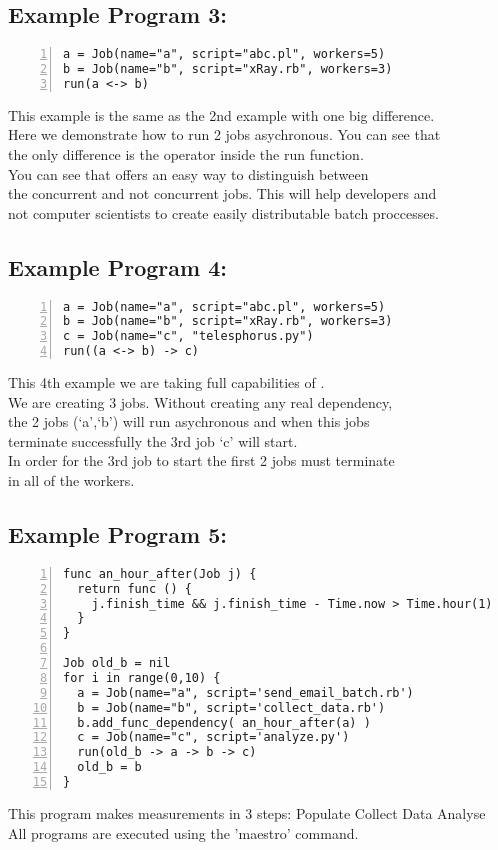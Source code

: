 \subsection*{Example Program 3:}
\begin{Verbatim}[numbers=left]
a = Job(name="a", script="abc.pl", workers=5)
b = Job(name="b", script="xRay.rb", workers=3)
run(a <-> b)
\end{Verbatim}

This example is the same as the 2nd example with one big difference.\\
Here we demonstrate how to run 2 jobs asychronous. You can see that\\
the only difference is the operator inside the run function.\\

You can see that \lang{} offers an easy way to distinguish between\\
the concurrent and not concurrent jobs. This will help developers and\\
not computer scientists to create easily distributable batch proccesses.\\

\subsection*{Example Program 4:}
\begin{Verbatim}[numbers=left]
a = Job(name="a", script="abc.pl", workers=5)
b = Job(name="b", script="xRay.rb", workers=3)
c = Job(name="c", "telesphorus.py")
run((a <-> b) -> c)
\end{Verbatim}

This 4th example we are taking full capabilities of \lang{}.\\
We are creating 3 jobs. Without creating any real dependency,\\
the 2 jobs (`a',`b') will run asychronous and when this jobs\\
terminate successfully the 3rd job `c' will start.\\
In order for the 3rd job to start the first 2 jobs must terminate\\
in all of the workers.\\

\subsection*{Example Program 5:}
\begin{Verbatim}[numbers=left]
func an_hour_after(Job j) {
  return func () {
    j.finish_time && j.finish_time - Time.now > Time.hour(1)
  }
}

Job old_b = nil
for i in range(0,10) {
  a = Job(name="a", script='send_email_batch.rb')
  b = Job(name="b", script='collect_data.rb')
  b.add_func_dependency( an_hour_after(a) )
  c = Job(name="c", script='analyze.py')
  run(old_b -> a -> b -> c)
  old_b = b
}
\end{Verbatim}
This program makes measurements in 3 steps:
Populate
Collect Data
Analyse
\\

All programs are executed using the 'maestro' command.
\\
